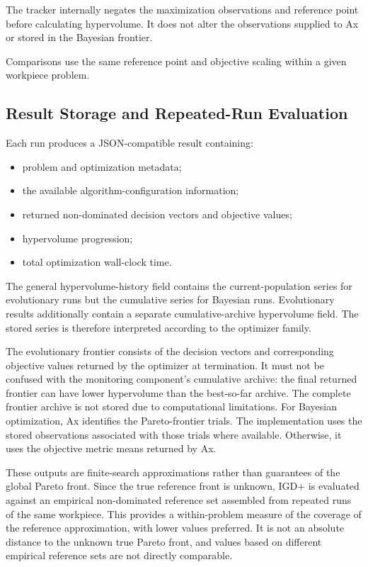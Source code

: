 The tracker internally negates the maximization observations and reference
point before calculating hypervolume. It does not alter the observations
supplied to Ax or stored in the Bayesian frontier.

Comparisons use the same reference point and objective scaling within a given
workpiece problem.

\subsection{Result Storage and Repeated-Run Evaluation}
\label{sec:common_output}

Each run produces a JSON-compatible result containing:
\begin{itemize}
    \item problem and optimization metadata;
    \item the available algorithm-configuration information;
    \item returned non-dominated decision vectors and objective values;
    \item hypervolume progression;
    \item total optimization wall-clock time.
\end{itemize}

The general hypervolume-history field contains the current-population series
for evolutionary runs but the cumulative series for Bayesian runs.
Evolutionary results additionally contain a separate cumulative-archive
hypervolume field. The stored series is therefore interpreted according
to the optimizer family.

The evolutionary frontier consists of the decision vectors and corresponding objective values returned by the optimizer at termination. It must not be
confused with the monitoring component's cumulative archive: the final returned frontier can have lower hypervolume than the best-so-far archive. The
complete frontier archive is not stored due to computational limitations. For Bayesian optimization, Ax identifies the Pareto-frontier trials. The
implementation uses the stored observations associated with those trials where available. Otherwise, it uses the objective metric means returned by
Ax.

These outputs are finite-search approximations rather than guarantees of
the global Pareto front. Since the true reference front is unknown, IGD+ is evaluated against an
empirical non-dominated reference set assembled from repeated runs of the
same workpiece. This provides a within-problem
measure of the coverage of the reference approximation,
with lower values preferred. It is not an absolute distance to the unknown
true Pareto front, and values based on different empirical reference sets
are not directly comparable.

